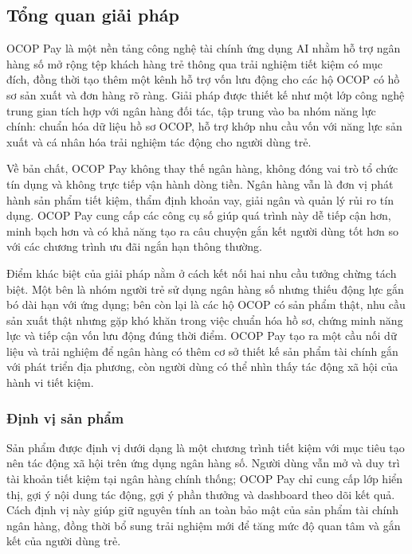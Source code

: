 \documentclass[13pt,a4paper]{extarticle}
\begin{document}
\subsection{Tổng quan giải pháp}

OCOP Pay là một nền tảng công nghệ tài chính ứng dụng AI nhằm hỗ trợ ngân hàng số mở rộng tệp khách hàng trẻ thông qua trải nghiệm tiết kiệm có mục đích, đồng thời tạo thêm một kênh hỗ trợ vốn lưu động cho các hộ OCOP có hồ sơ sản xuất và đơn hàng rõ ràng. Giải pháp được thiết kế như một lớp công nghệ trung gian tích hợp với ngân hàng đối tác, tập trung vào ba nhóm năng lực chính: chuẩn hóa dữ liệu hồ sơ OCOP, hỗ trợ khớp nhu cầu vốn với năng lực sản xuất và cá nhân hóa trải nghiệm tác động cho người dùng trẻ.

Về bản chất, OCOP Pay không thay thế ngân hàng, không đóng vai trò tổ chức tín dụng và không trực tiếp vận hành dòng tiền. Ngân hàng vẫn là đơn vị phát hành sản phẩm tiết kiệm, thẩm định khoản vay, giải ngân và quản lý rủi ro tín dụng. OCOP Pay cung cấp các công cụ số giúp quá trình này dễ tiếp cận hơn, minh bạch hơn và có khả năng tạo ra câu chuyện gắn kết người dùng tốt hơn so với các chương trình ưu đãi ngắn hạn thông thường.

Điểm khác biệt của giải pháp nằm ở cách kết nối hai nhu cầu tưởng chừng tách biệt. Một bên là nhóm người trẻ sử dụng ngân hàng số nhưng thiếu động lực gắn bó dài hạn với ứng dụng; bên còn lại là các hộ OCOP có sản phẩm thật, nhu cầu sản xuất thật nhưng gặp khó khăn trong việc chuẩn hóa hồ sơ, chứng minh năng lực và tiếp cận vốn lưu động đúng thời điểm. OCOP Pay tạo ra một cầu nối dữ liệu và trải nghiệm để ngân hàng có thêm cơ sở thiết kế sản phẩm tài chính gắn với phát triển địa phương, còn người dùng có thể nhìn thấy tác động xã hội của hành vi tiết kiệm.


\subsubsection{Định vị sản phẩm}

Sản phẩm được định vị dưới dạng là một chương trình tiết kiệm với mục tiêu tạo nên tác động xã hội trên ứng dụng ngân hàng số. Người dùng vẫn mở và duy trì tài khoản tiết kiệm tại ngân hàng chính thống; OCOP Pay chỉ cung cấp lớp hiển thị, gợi ý nội dung tác động, gợi ý phần thưởng và dashboard theo dõi kết quả. Cách định vị này giúp giữ nguyên tính an toàn bảo mật của sản phẩm tài chính ngân hàng, đồng thời bổ sung trải nghiệm mới để tăng mức độ quan tâm và gắn kết của người dùng trẻ.
\end{document}
